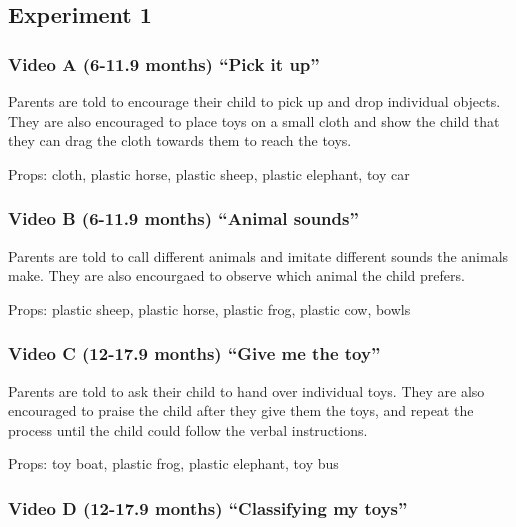 \documentclass[]{article}
\begin{document}
\hypertarget{experiment-1-1}{%
\subsection{Experiment 1}\label{experiment-1-1}}

\hypertarget{video-a-6-11.9-months-pick-it-up}{%
\subsubsection{Video A (6-11.9 months) ``Pick it
up''}\label{video-a-6-11.9-months-pick-it-up}}

Parents are told to encourage their child to pick up and drop individual
objects. They are also encouraged to place toys on a small cloth and
show the child that they can drag the cloth towards them to reach the
toys.

Props: cloth, plastic horse, plastic sheep, plastic elephant, toy car

\hypertarget{video-b-6-11.9-months-animal-sounds}{%
\subsubsection{Video B (6-11.9 months) ``Animal
sounds''}\label{video-b-6-11.9-months-animal-sounds}}

Parents are told to call different animals and imitate different sounds
the animals make. They are also encourgaed to observe which animal the
child prefers.

Props: plastic sheep, plastic horse, plastic frog, plastic cow, bowls

\hypertarget{video-c-12-17.9-months-give-me-the-toy}{%
\subsubsection{Video C (12-17.9 months) ``Give me the
toy''}\label{video-c-12-17.9-months-give-me-the-toy}}

Parents are told to ask their child to hand over individual toys. They
are also encouraged to praise the child after they give them the toys,
and repeat the process until the child could follow the verbal
instructions.

Props: toy boat, plastic frog, plastic elephant, toy bus

\hypertarget{video-d-12-17.9-months-classifying-my-toys}{%
\subsubsection{Video D (12-17.9 months) ``Classifying my
toys''}\label{video-d-12-17.9-months-classifying-my-toys}}
\end{document}
